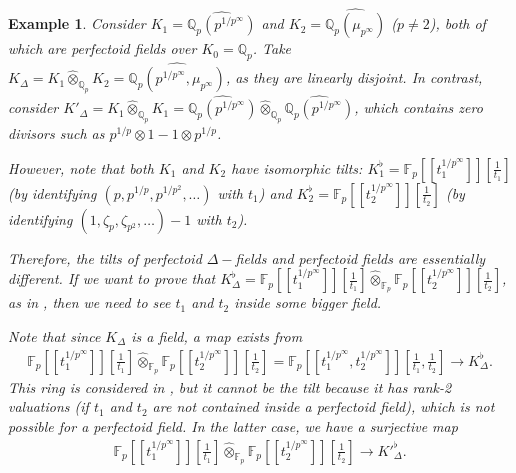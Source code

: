 \documentclass[12pts,a4paper]{amsart}
\newtheorem{example}[proposition]{Example}
\begin{document}
\begin{example}
Consider $K_1 = \widehat{\mathbb{Q}_p(p^{1/p^\infty})}$ and $K_2 = \widehat{\mathbb{Q}_p(\mu_{p^\infty})}$ ($p \neq 2$), both of which are perfectoid fields over $K_0 = \mathbb{Q}_p$. Take $K_\Delta = K_1 \widehat{\otimes}_{\mathbb{Q}_p} K_2 = \widehat{\mathbb{Q}_p(p^{1/p^\infty}, \mu_{p^\infty})}$, as they are linearly disjoint. In contrast, consider $K'_\Delta = K_1 \widehat{\otimes}_{\mathbb{Q}_p} K_1 = \widehat{\mathbb{Q}_p(p^{1/p^\infty})} \widehat{\otimes}_{\mathbb{Q}_p} \widehat{\mathbb{Q}_p(p^{1/p^\infty})}$, which contains zero divisors such as $p^{1/p} \otimes 1 - 1 \otimes p^{1/p}$.

However, note that both $K_1$ and $K_2$ have isomorphic tilts: $K_1^\flat = \mathbb{F}_p[[t_1^{1/p^\infty}]]\left[\frac{1}{t_1}\right]$ (by identifying $(p, p^{1/p}, p^{1/p^2}, \dots)$ with $t_1$) and $K_2^\flat = \mathbb{F}_p[[t_2^{1/p^\infty}]]\left[\frac{1}{t_2}\right]$ (by identifying $(1, \zeta_p, \zeta_{p^2}, \dots)-1$ with $t_2$).

Therefore, the tilts of perfectoid $\Delta-$fields and perfectoid fields are essentially different. If we want to prove that $K_\Delta^\flat = \mathbb{F}_p[[t_1^{1/p^\infty}]]\left[\frac{1}{t_1}\right] \widehat{\otimes}_{\mathbb{F}_p} \mathbb{F}_p[[t_2^{1/p^\infty}]]\left[\frac{1}{t_2}\right]$, as in \cite{Bri}, then we need to see $t_1$ and $t_2$ inside some bigger field.

Note that since $K_\Delta$ is a field, a map exists from
\begin{align*}
\mathbb{F}_p[[t_1^{1/p^\infty}]]\left[\frac{1}{t_1}\right] \widehat{\otimes}_{\mathbb{F}_p} \mathbb{F}_p[[t_2^{1/p^\infty}]]\left[\frac{1}{t_2}\right] = \mathbb{F}_p[[t_1^{1/p^\infty}, t_2^{1/p^\infty}]]\left[\frac{1}{t_1}, \frac{1}{t_2}\right] \to K_\Delta^\flat.
\end{align*}
This ring is considered in \cite{Zab, CarKedZab, Pal-Zab}, but it cannot be the tilt because it has rank-2 valuations (if $t_1$ and $t_2$ are not contained inside a perfectoid field), which is not possible for a perfectoid field. In the latter case, we have a surjective map
\begin{align*}
\mathbb{F}_p[[t^{1/p^\infty}_1]]\left[\frac{1}{t_1}\right]\hat{\otimes}_{\mathbb{F}_p}\mathbb{F}_p[[t^{1/p^\infty}_2]]\left[\frac{1}{t_2}\right]\to K'^{\flat}_\Delta.
\end{align*}
\end{example}

\end{document}

